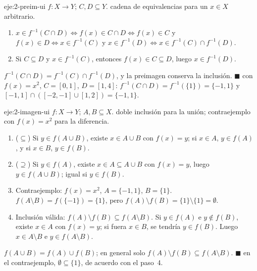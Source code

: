 \begin{solucion}{eje:2-preim-ui}
\datos $f\colon X\to Y$; $C,D\subseteq Y$.
\planteamiento cadena de equivalencias para un $x\in X$ arbitrario.
\pasos
\begin{enumerate}[label=\arabic*.]
  \item $x\in f^{-1}(C\cap D)\iff f(x)\in C\cap D\iff f(x)\in C$ y $f(x)\in D\iff x\in f^{-1}(C)$ y $x\in f^{-1}(D)\iff x\in f^{-1}(C)\cap f^{-1}(D)$.
  \item Si $C\subseteq D$ y $x\in f^{-1}(C)$, entonces $f(x)\in C\subseteq D$, luego $x\in f^{-1}(D)$.
\end{enumerate}
\resultado $f^{-1}(C\cap D)=f^{-1}(C)\cap f^{-1}(D)$, y la preimagen conserva la inclusión. \hfill$\blacksquare$
\comprobacion con $f(x)=x^{2}$, $C=[0,1]$, $D=[1,4]$: $f^{-1}(C\cap D)=f^{-1}(\{1\})=\{-1,1\}$ y $[-1,1]\cap([-2,-1]\cup[1,2])=\{-1,1\}$.
\end{solucion}

\begin{solucion}{eje:2-imagen-ui}
\datos $f\colon X\to Y$; $A,B\subseteq X$.
\planteamiento doble inclusión para la unión; contraejemplo con $f(x)=x^{2}$ para la diferencia.
\pasos
\begin{enumerate}[label=\arabic*.]
  \item ($\subseteq$) Si $y\in f(A\cup B)$, existe $x\in A\cup B$ con $f(x)=y$; si $x\in A$, $y\in f(A)$, y si $x\in B$, $y\in f(B)$.
  \item ($\supseteq$) Si $y\in f(A)$, existe $x\in A\subseteq A\cup B$ con $f(x)=y$, luego $y\in f(A\cup B)$; igual si $y\in f(B)$.
  \item Contraejemplo: $f(x)=x^{2}$, $A=\{-1,1\}$, $B=\{1\}$. $f(A\setminus B)=f(\{-1\})=\{1\}$, pero $f(A)\setminus f(B)=\{1\}\setminus\{1\}=\emptyset$.
  \item Inclusión válida: $f(A)\setminus f(B)\subseteq f(A\setminus B)$. Si $y\in f(A)$ e $y\notin f(B)$, existe $x\in A$ con $f(x)=y$; si fuera $x\in B$, se tendría $y\in f(B)$. Luego $x\in A\setminus B$ e $y\in f(A\setminus B)$.
\end{enumerate}
\resultado $f(A\cup B)=f(A)\cup f(B)$; en general solo $f(A)\setminus f(B)\subseteq f(A\setminus B)$. \hfill$\blacksquare$
\comprobacion en el contraejemplo, $\emptyset\subseteq\{1\}$, de acuerdo con el paso~4.
\end{solucion}

